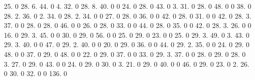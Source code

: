 25. 0 28. 6. 44. 0 4. 32. 0 28. 8. 40. 0 0 24. 0 28. 0 43. 0 3. 31. 0 28. 0 48. 0 0 38. 0 28. 2. 36. 0 2. 34. 0 28. 2. 34. 0 0 27. 0 28. 0 36. 0 0 42. 0 28. 0 31. 0 0 42. 0 28. 3. 37. 0 0 28. 0 28. 0 46. 0 0 26. 0 28. 0 33. 0 0 44. 0 28. 0 35. 0 0 42. 0 28. 3. 26. 0 0 16. 0 29. 3. 45. 0 0 30. 0 29. 0 56. 0 0 25. 0 29. 0 23. 0 0 25. 0 29. 3. 49. 0 3. 43. 0 29. 3. 40. 0 0 47. 0 29. 2. 40. 0 0 20. 0 29. 0 36. 0 0 44. 0 29. 2. 35. 0 0 24. 0 29. 0 48. 0 0 37. 0 29. 0 48. 0 0 22. 0 29. 0 37. 0 0 33. 0 29. 3. 37. 0 0 28. 0 29. 0 28. 0 3. 27. 0 29. 0 43. 0 0 24. 0 29. 0 30. 0 3. 21. 0 29. 0 40. 0 0 46. 0 29. 0 23. 0 2. 26. 0 30. 0 32. 0 0 136. 0 